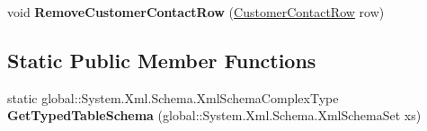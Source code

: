\begin{DoxyCompactItemize}
\item 
void {\bfseries Remove\+Customer\+Contact\+Row} (\hyperlink{class_products_1_1_data_1_1ds_sage_1_1_customer_contact_row}{Customer\+Contact\+Row} row)\hypertarget{class_products_1_1_data_1_1ds_sage_1_1_customer_contact_data_table_ae4276b4b6680d601fb10de17a2a78bfb}{}\label{class_products_1_1_data_1_1ds_sage_1_1_customer_contact_data_table_ae4276b4b6680d601fb10de17a2a78bfb}

\end{DoxyCompactItemize}
\subsection*{Static Public Member Functions}
\begin{DoxyCompactItemize}
\item 
static global\+::\+System.\+Xml.\+Schema.\+Xml\+Schema\+Complex\+Type {\bfseries Get\+Typed\+Table\+Schema} (global\+::\+System.\+Xml.\+Schema.\+Xml\+Schema\+Set xs)\hypertarget{class_products_1_1_data_1_1ds_sage_1_1_customer_contact_data_table_a71a2cdce9e99f11d7906e2abfec6befb}{}\label{class_products_1_1_data_1_1ds_sage_1_1_customer_contact_data_table_a71a2cdce9e99f11d7906e2abfec6befb}

\end{DoxyCompactItemize}
